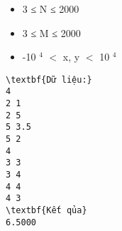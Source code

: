 \begin{itemize}
	\item     3 ≤ N ≤ 2000   
	\item     3 ≤ M ≤ 2000   
	\item     -10    $^     4    $    $<$ x, y $<$ 10    $^     4    $
\end{itemize}
\begin{verbatim}
\textbf{Dữ liệu:}
4
2 1 
2 5  
5 3.5  
5 2
4
3 3 
3 4 
4 4 
4 3  
\textbf{Kết qủa}
6.5000
\end{verbatim}